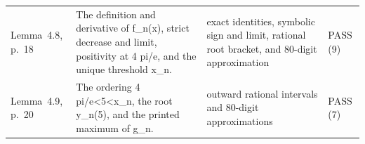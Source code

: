 {\begin{longtable}{@{}>{\raggedright\arraybackslash}p{30mm}>{\raggedright\arraybackslash}p{64mm}>{\raggedright\arraybackslash}p{44mm}>{\raggedright\arraybackslash}p{16mm}@{}}
Lemma~4.8, p.~18 & The definition and derivative of f\_n(x), strict decrease and limit, positivity at 4 pi/e, and the unique threshold x\_n. & exact identities, symbolic sign and limit, rational root bracket, and 80-digit approximation & PASS (9) \\
Lemma~4.9, p.~20 & The ordering 4 pi/e<5<x\_n, the root y\_n(5), and the printed maximum of g\_n. & outward rational intervals and 80-digit approximations & PASS (7) \\
\end{longtable}
}
